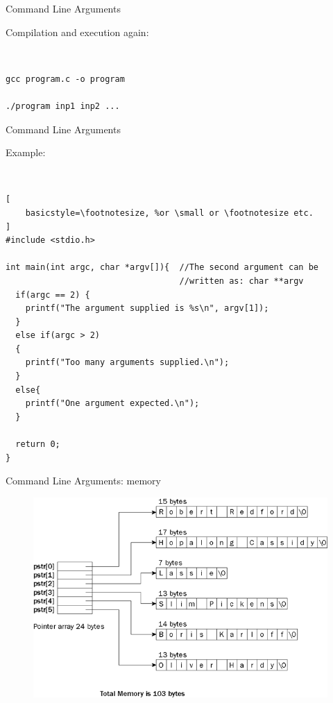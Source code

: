 \documentclass[10pt]{beamer}
\begin{document}
\begin{frame}[fragile]{Command Line Arguments}

Compilation and execution again:

\ \\

\begin{lstlisting}
gcc program.c -o program

./program inp1 inp2 ...
\end{lstlisting}
\end{frame}


\begin{frame}[fragile]{Command Line Arguments}

Example:

\ \\

\begin{lstlisting}[
    basicstyle=\footnotesize, %or \small or \footnotesize etc.
]
#include <stdio.h>

int main(int argc, char *argv[]){  //The second argument can be
                                   //written as: char **argv
  if(argc == 2) {
    printf("The argument supplied is %s\n", argv[1]);
  }
  else if(argc > 2)
  {
    printf("Too many arguments supplied.\n");
  }
  else{
    printf("One argument expected.\n");
  }

  return 0;
}
\end{lstlisting}
\end{frame}


\begin{frame}[fragile]{Command Line Arguments: memory}
\begin{figure}[h]
    \centering
    \hspace*{-1.1cm}
    \includegraphics[width=1.05\textwidth]{char_p_p}
    \label{fig:2d_lattice_into_matrix}
\end{figure}
\end{frame}
\end{document}

